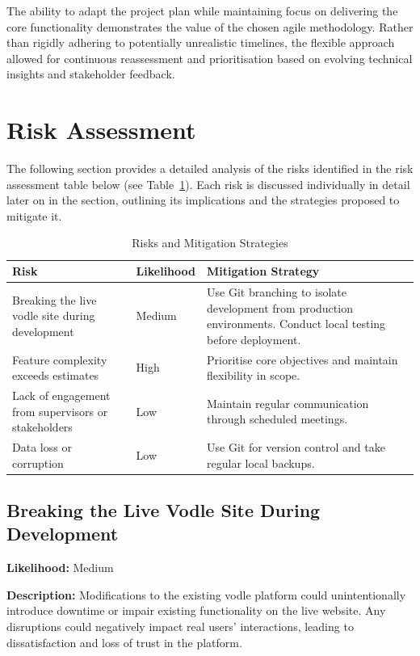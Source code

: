 The ability to adapt the project plan while maintaining focus on delivering the core functionality demonstrates the value of the chosen agile methodology. Rather than rigidly adhering to potentially unrealistic timelines, the flexible approach allowed for continuous reassessment and prioritisation based on evolving technical insights and stakeholder feedback.
\section{Risk Assessment}
The following section provides a detailed analysis of the risks identified in the risk assessment table below (see Table~\ref{tab:risk-assessment}). Each risk is discussed individually in detail later on in the section, outlining its implications and the strategies proposed to mitigate it.

\begin{table}[H]
\centering
\begin{tabular}{|p{4.5cm}|p{2cm}|p{8cm}|}
\hline
\textbf{Risk} & \textbf{Likelihood} & \textbf{Mitigation Strategy} \\
\hline
Breaking the live vodle site during development & Medium & Use Git branching to isolate development from production environments. Conduct local testing before deployment. \\
\hline
Feature complexity exceeds estimates & High & Prioritise core objectives and maintain flexibility in scope. \\
\hline
Lack of engagement from supervisors or stakeholders & Low & Maintain regular communication through scheduled meetings. \\
\hline
Data loss or corruption & Low & Use Git for version control and take regular local backups. \\
\hline
\end{tabular}
\caption{Risks and Mitigation Strategies}\label{tab:risk-assessment}
\end{table}

\subsection*{Breaking the Live Vodle Site During Development}

\textbf{Likelihood:} Medium

\textbf{Description:} Modifications to the existing vodle platform could unintentionally introduce downtime or impair existing functionality on the live website. Any disruptions could negatively impact real users' interactions, leading to dissatisfaction and loss of trust in the platform.

